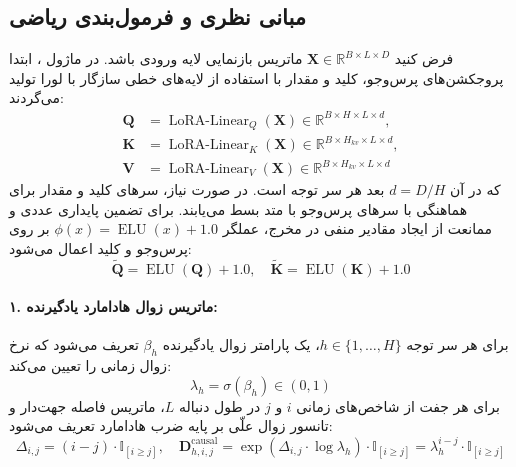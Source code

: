 \subsection{مبانی نظری و فرمول‌بندی ریاضی}
فرض کنید $\mathbf{X} \in \mathbb{R}^{B \times L \times D}$ ماتریس بازنمایی لایه ورودی باشد. در ماژول ، ابتدا پروجکشن‌های پرس‌وجو، کلید و مقدار با استفاده از لایه‌های خطی سازگار با لورا تولید می‌گردند:
\begin{align}
\mathbf{Q} &= \operatorname{LoRA-Linear}_Q(\mathbf{X}) \in \mathbb{R}^{B \times H \times L \times d}, \\
\mathbf{K} &= \operatorname{LoRA-Linear}_K(\mathbf{X}) \in \mathbb{R}^{B \times H_{kv} \times L \times d}, \\
\mathbf{V} &= \operatorname{LoRA-Linear}_V(\mathbf{X}) \in \mathbb{R}^{B \times H_{kv} \times L \times d}
\end{align}
که در آن $d = D / H$ بعد هر سر توجه است. در صورت نیاز، سرهای کلید و مقدار برای هماهنگی با سرهای پرس‌وجو با متد  بسط می‌یابند. برای تضمین پایداری عددی و ممانعت از ایجاد مقادیر منفی در مخرج، عملگر $\phi(x) = \operatorname{ELU}(x) + 1.0$ بر روی پرس‌وجو و کلید اعمال می‌شود:
\begin{equation}
\tilde{\mathbf{Q}} = \operatorname{ELU}(\mathbf{Q}) + 1.0, \quad \tilde{\mathbf{K}} = \operatorname{ELU}(\mathbf{K}) + 1.0
\end{equation}

\paragraph{۱. ماتریس زوال هادامارد یادگیرنده:}
برای هر سر توجه $h \in \{1, \dots, H\}$، یک پارامتر زوال یادگیرنده $\beta_h$ تعریف می‌شود که نرخ زوال زمانی را تعیین می‌کند:
\begin{equation}
\lambda_h = \sigma(\beta_h) \in (0, 1)
\end{equation}
برای هر جفت از شاخص‌های زمانی $i$ و $j$ در طول دنباله $L$، ماتریس فاصله جهت‌دار و تانسور زوال علّی بر پایه ضرب هادامارد تعریف می‌شود:
\begin{equation}
\Delta_{i, j} = (i - j) \cdot \mathbb{I}_{[i \ge j]}, \quad \mathbf{D}_{h, i, j}^{\text{causal}} = \exp\left( \Delta_{i, j} \cdot \log \lambda_h \right) \cdot \mathbb{I}_{[i \ge j]} = \lambda_h^{i - j} \cdot \mathbb{I}_{[i \ge j]}
\end{equation}

